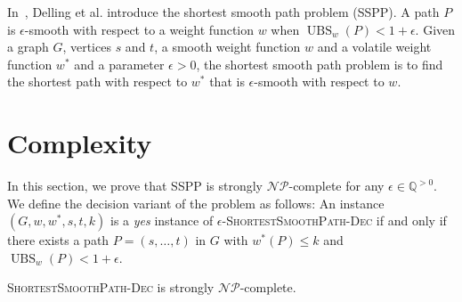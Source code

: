 \documentclass[a4paper,UKenglish,cleveref, autoref, thm-restate]{lipics-v2021}
\newcommand*{\ubs}{\operatorname{UBS}}
\begin{document}
In~\cite{dss-tarrn-18}, Delling et al. introduce the shortest smooth path problem (SSPP).
A path $P$ is $\epsilon$-smooth with respect to a weight function $w$ when $\ubs_w(P) < 1 + \epsilon$.
Given a graph $G$, vertices $s$ and $t$, a smooth weight function $w$ and a volatile weight function $w^*$ and a parameter $\epsilon > 0$, the shortest smooth path problem is to find the shortest path with respect to $w^*$ that is $\epsilon$-smooth with respect to $w$.

\section{Complexity}\label{sec:complexity}

In this section, we prove that SSPP is strongly $\mathcal{NP}$-complete for any $\epsilon \in \mathbb{Q}^{>0}$.
We define the decision variant of the problem as follows:
An instance $(G, w, w^*, s, t, k)$ is a \emph{yes} instance of $\epsilon$-\textsc{ShortestSmoothPath-Dec} if and only if there exists a path $P = (s,\dots, t)$ in $G$ with $w^*(P) \leq k$ and $\ubs_w(P) < 1 + \epsilon$.

\begin{theorem}
\textsc{ShortestSmoothPath-Dec} is strongly $\mathcal{NP}$-complete.
\end{theorem}
\end{document}
